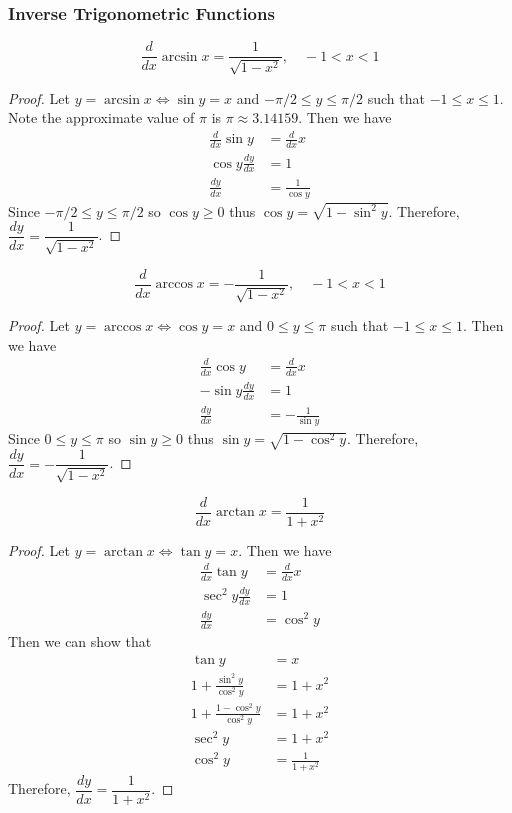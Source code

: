 \subsubsection*{Inverse Trigonometric Functions}
\begin{theorem}
    \[\frac{d}{dx}\arcsin x=\frac{1}{\sqrt{1-x^2}},\quad -1<x<1 \]
\end{theorem}
\begin{proof}
    Let \(y=\arcsin x \iff \sin y=x\) and \(-\pi/2\leq y\leq\pi/2\) such that
    \(-1\leq x\leq 1\).
    Note the approximate value of \(\pi\) is \(\pi\approx 3.14159\).
    Then we have
    \begin{align*}
        \frac{d}{dx}\sin y &= \frac{d}{dx}x \\
        \cos y\frac{dy}{dx} &= 1 \\
        \frac{dy}{dx} &= \frac{1}{\cos y}
    \end{align*}
    Since \(-\pi/2\leq y\leq\pi/2\) so \(\cos y\geq0\) thus
    \(\cos y=\sqrt{1-\sin^2 y}\).
    Therefore, \(\dfrac{dy}{dx}=\dfrac{1}{\sqrt{1-x^2}}\).
\end{proof}
\begin{theorem}
    \[\frac{d}{dx}\arccos x=-\frac{1}{\sqrt{1-x^2}},\quad -1<x<1 \]
\end{theorem}
\begin{proof}
    Let \(y=\arccos x \iff \cos y=x\) and \(0\leq y\leq\pi\) such that
    \(-1\leq x\leq 1\).
    Then we have
    \begin{align*}
        \frac{d}{dx}\cos y &= \frac{d}{dx}x \\
        -\sin y\frac{dy}{dx} &= 1 \\
        \frac{dy}{dx} &= -\frac{1}{\sin y}
    \end{align*}
    Since \(0\leq y\leq\pi\) so \(\sin y\geq0\) thus
    \(\sin y=\sqrt{1-\cos^2 y}\).
    Therefore, \(\dfrac{dy}{dx}=-\dfrac{1}{\sqrt{1-x^2}}\).
\end{proof}
\begin{theorem}
    \[\frac{d}{dx}\arctan x=\frac{1}{1+x^2} \]
\end{theorem}
\begin{proof}
    Let \(y=\arctan x \iff \tan y=x\).
    Then we have
    \begin{align*}
        \frac{d}{dx}\tan y &= \frac{d}{dx}x \\
        \sec^2 y\frac{dy}{dx} &= 1 \\
        \frac{dy}{dx} &= \cos^2 y
    \end{align*}
    Then we can show that
    \begin{align*}
        \tan y &= x \\
        1+\frac{\sin^2 y}{\cos^2 y} &= 1+x^2\\
        1+\frac{1-\cos^2 y}{\cos^2 y} &= 1+x^2 \\
        \sec^2 y &= 1+x^2 \\
        \cos^2y &= \frac{1}{1+x^2}
    \end{align*}
    Therefore, \(\dfrac{dy}{dx}=\dfrac{1}{1+x^2}\).
\end{proof}